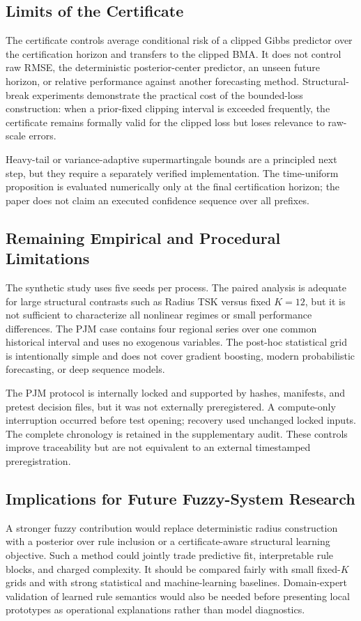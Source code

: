 \subsection{Limits of the Certificate}
The certificate controls average conditional risk of a clipped Gibbs predictor over the certification horizon and transfers to the clipped BMA. It does not control raw RMSE, the deterministic posterior-center predictor, an unseen future horizon, or relative performance against another forecasting method. Structural-break experiments demonstrate the practical cost of the bounded-loss construction: when a prior-fixed clipping interval is exceeded frequently, the certificate remains formally valid for the clipped loss but loses relevance to raw-scale errors.

Heavy-tail or variance-adaptive supermartingale bounds \cite{haddouche2023heavy,rodriguez2024more} are a principled next step, but they require a separately verified implementation. The time-uniform proposition is evaluated numerically only at the final certification horizon; the paper does not claim an executed confidence sequence over all prefixes.

\subsection{Remaining Empirical and Procedural Limitations}
The synthetic study uses five seeds per process. The paired analysis is adequate for large structural contrasts such as Radius TSK versus fixed $K=12$, but it is not sufficient to characterize all nonlinear regimes or small performance differences. The PJM case contains four regional series over one common historical interval and uses no exogenous variables. The post-hoc statistical grid is intentionally simple and does not cover gradient boosting, modern probabilistic forecasting, or deep sequence models.

The PJM protocol is internally locked and supported by hashes, manifests, and pretest decision files, but it was not externally preregistered. A compute-only interruption occurred before test opening; recovery used unchanged locked inputs. The complete chronology is retained in the supplementary audit. These controls improve traceability but are not equivalent to an external timestamped preregistration.

\subsection{Implications for Future Fuzzy-System Research}
A stronger fuzzy contribution would replace deterministic radius construction with a posterior over rule inclusion or a certificate-aware structural learning objective. Such a method could jointly trade predictive fit, interpretable rule blocks, and charged complexity. It should be compared fairly with small fixed-$K$ grids and with strong statistical and machine-learning baselines. Domain-expert validation of learned rule semantics would also be needed before presenting local prototypes as operational explanations rather than model diagnostics.

